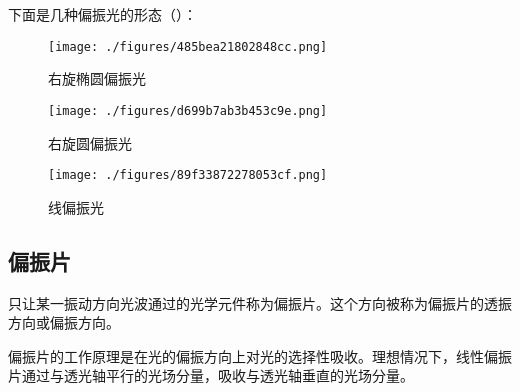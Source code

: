 下面是几种偏振光的形态（）：

\begin{figure}[ht]
\centering
\texttt{[image: ./figures/485bea21802848cc.png]}
\caption{右旋椭圆偏振光} \label{fig_PolLig_6}
\end{figure}

\begin{figure}[ht]
\centering
\texttt{[image: ./figures/d699b7ab3b453c9e.png]}
\caption{右旋圆偏振光} \label{fig_PolLig_7}
\end{figure}

\begin{figure}[ht]
\centering
\texttt{[image: ./figures/89f33872278053cf.png]}
\caption{线偏振光} \label{fig_PolLig_10}
\end{figure}

\subsection{偏振片}
只让某一振动方向光波通过的光学元件称为偏振片。这个方向被称为偏振片的透振方向或偏振方向。

偏振片的工作原理是在光的偏振方向上对光的选择性吸收。理想情况下，线性偏振片通过与透光轴平行的光场分量，吸收与透光轴垂直的光场分量。

